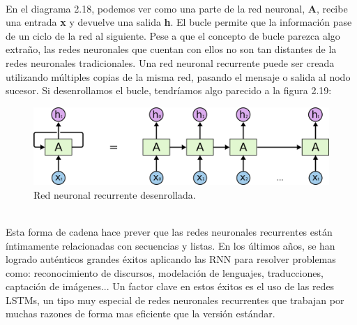 \\En el diagrama 2.18, podemos ver como una parte de la red neuronal, \textbf{A}, recibe una entrada \textbf{x} y devuelve una salida \textbf{h}. El bucle permite que la información pase de un ciclo de la red al siguiente. Pese a que el concepto de bucle parezca algo extraño, las redes neuronales que cuentan con ellos no son tan distantes de la redes neuronales tradicionales. Una red neuronal recurrente puede ser creada utilizando múltiples copias de la misma red, pasando el mensaje o salida al nodo sucesor. Si desenrollamos el bucle, tendríamos algo parecido a la figura 2.19:\\
\begin{figure}[htp]
\centering
\vspace{-1.5em}
\includegraphics[scale=0.3]{images/RNNunrolled.png}
\caption{Red neuronal recurrente desenrollada.}
\end{figure}
\\Esta forma de cadena hace prever que las redes neuronales recurrentes están íntimamente relacionadas con secuencias y listas. En los últimos años, se han logrado auténticos grandes éxitos aplicando las RNN para resolver problemas como: reconocimiento de discursos, modelación de lenguajes, traducciones, captación de imágenes... Un factor clave en estos éxitos es el uso de las redes LSTMs, un tipo muy especial de redes neuronales recurrentes que trabajan por muchas razones de forma mas eficiente que la versión estándar.
